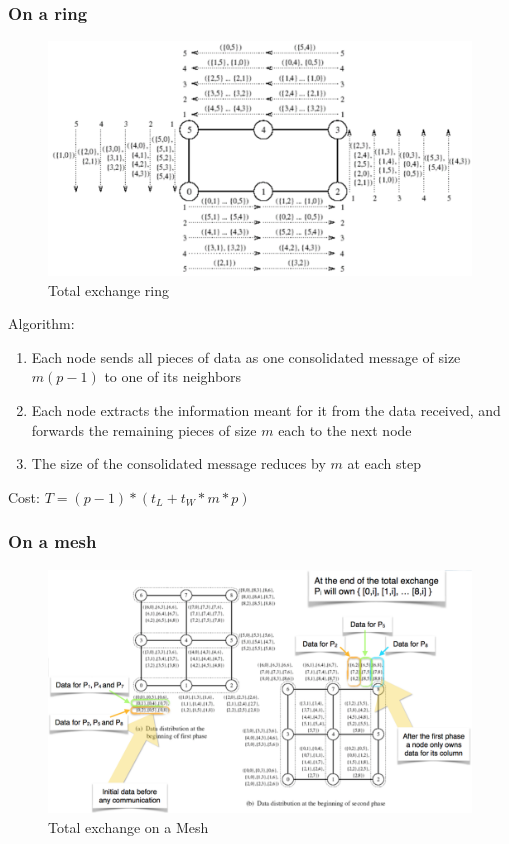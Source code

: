 \documentclass[11pt,a4paper]{report}
\begin{document}
\subsubsection{On a ring}

\begin{figure}[H]
    \centering
    \includegraphics[width=0.7\linewidth]{img/comm_ring_totalexchange}
    \caption{Total exchange ring}
    \label{fig:commringtotalexchange}
\end{figure}

Algorithm:

\begin{enumerate}
    \item Each node sends all pieces of data as one consolidated message of 
    size $m(p - 1)$ to one of its neighbors
    
    \item Each node extracts the information meant for it from the data 
    received, and forwards the remaining pieces of size $m$ each to the next 
    node
    
    \item The size of the consolidated message reduces by $m$ at each step
\end{enumerate}

Cost: $ T = (p-1) * (t_{L} + t_{W} * m * p) $

\subsubsection{On a mesh}

\begin{figure}[H]
    \centering
    \includegraphics[width=0.7\linewidth]{img/comm_mesh_totalexchange}
    \caption{Total exchange on a Mesh}
    \label{fig:commmeshtotalexchange}
\end{figure}
\end{document}
